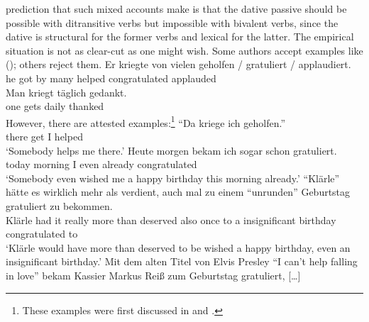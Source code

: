 prediction that such mixed accounts make is that the dative passive should be possible with
ditransitive verbs but impossible with bivalent verbs, since the dative is structural for the former
verbs and lexical for the latter. The empirical situation is not as clear-cut as one might
wish. Some authors accept examples like (); others reject them.
\eal
\label{ex-helfen-with-dative-passive}
\ex 
\gll Er kriegte von vielen geholfen / gratuliert / applaudiert.\\
     he got by many helped {} congratulated {} applauded\\
\ex 
\gll Man kriegt täglich gedankt.\\
     one gets   daily thanked\\
\zl
However, there are attested examples:\footnote{
  These examples were first discussed in  and .
}
\eal
\label{ex-helfen-with-dative-passive-corpus}
\ex "`Da kriege ich geholfen."'\footnotemark\\
     \quotespace{}there get  I  helped\\
\glt `Somebody helps me there.'
\ex
\gll Heute morgen bekam ich sogar schon gratuliert.\footnotemark\\
     today morning \AUX{}  I even already congratulated\\
\glt `Somebody even wished me a happy birthday this morning already.'
\ex
\gll "`Klärle"' hätte es wirklich mehr als verdient, auch mal zu einem "`unrunden"' Geburtstag gratuliert zu bekommen.\footnotemark\\
     \hphantom{"`}Klärle had it really more than deserved also once to a \hphantom{"`}insignificant birthday congratulated to \AUX\\
\glt `Klärle would have more than deserved to be wished a happy birthday, even an insignificant birthday.'
\ex 
\gll Mit dem alten Titel von Elvis Presley "`I can't help falling in love"' bekam Kassier Markus Reiß zum Geburtstag gratuliert, [\ldots]\footnotemark\\
